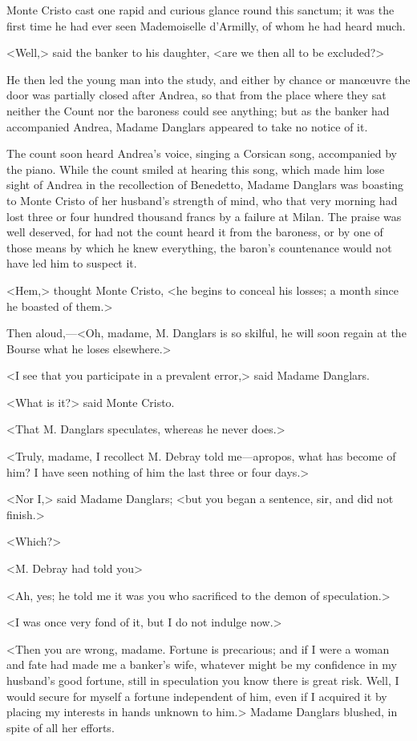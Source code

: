  Monte Cristo cast one rapid and curious glance round this sanctum; it was the first time he had ever seen Mademoiselle d'Armilly, of whom he had heard much. 

 <Well,> said the banker to his daughter, <are we then all to be excluded?> 

 He then led the young man into the study, and either by chance or manœuvre the door was partially closed after Andrea, so that from the place where they sat neither the Count nor the baroness could see anything; but as the banker had accompanied Andrea, Madame Danglars appeared to take no notice of it. 

 The count soon heard Andrea's voice, singing a Corsican song, accompanied by the piano. While the count smiled at hearing this song, which made him lose sight of Andrea in the recollection of Benedetto, Madame Danglars was boasting to Monte Cristo of her husband's strength of mind, who that very morning had lost three or four hundred thousand francs by a failure at Milan. The praise was well deserved, for had not the count heard it from the baroness, or by one of those means by which he knew everything, the baron's countenance would not have led him to suspect it. 

 <Hem,> thought Monte Cristo, <he begins to conceal his losses; a month since he boasted of them.> 

 Then aloud,—<Oh, madame, M. Danglars is so skilful, he will soon regain at the Bourse what he loses elsewhere.> 

 <I see that you participate in a prevalent error,> said Madame Danglars. 

 <What is it?> said Monte Cristo. 

 <That M. Danglars speculates, whereas he never does.> 

 <Truly, madame, I recollect M. Debray told me—apropos, what has become of him? I have seen nothing of him the last three or four days.> 

 <Nor I,> said Madame Danglars; <but you began a sentence, sir, and did not finish.> 

 <Which?> 

 <M. Debray had told you\longdash> 

 <Ah, yes; he told me it was you who sacrificed to the demon of speculation.> 

 <I was once very fond of it, but I do not indulge now.> 

 <Then you are wrong, madame. Fortune is precarious; and if I were a woman and fate had made me a banker's wife, whatever might be my confidence in my husband's good fortune, still in speculation you know there is great risk. Well, I would secure for myself a fortune independent of him, even if I acquired it by placing my interests in hands unknown to him.> Madame Danglars blushed, in spite of all her efforts. 

